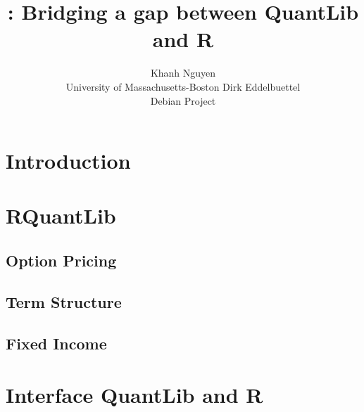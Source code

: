 \documentclass[nojss]{jss}
\author{Khanh Nguyen\\University of Massachusetts-Boston \And 
        Dirk Eddelbuettel\\Debian Project}
\title{\pkg{RQuantLib}: Bridging a gap between QuantLib and R}
\begin{document}

\section{Introduction}
\section{RQuantLib}
\subsection*{Option Pricing}
\subsection*{Term Structure}
\subsection*{Fixed Income}
\section{Interface QuantLib and R}
\end{document}
